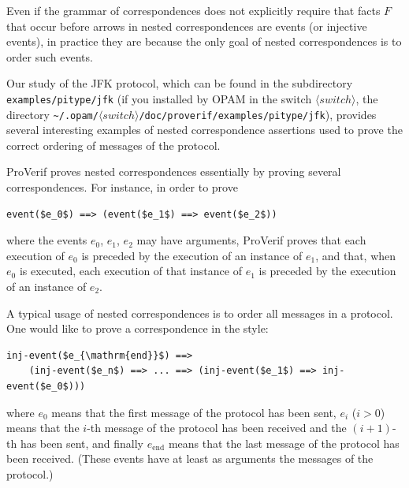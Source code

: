 \documentclass{book}
\newcommand{\nonterm}[1]{\langle\mathit{#1}\rangle}
\newcommand{\switchdir}{\nonterm{switch}}
\newcommand{\opamsubdir}[1]{\nolinkurl{~/.opam/}$\switchdir$\nolinkurl{/#1}}
\begin{document}
Even if the grammar of correspondences does not explicitly require
that facts $F$ that occur before arrows in nested correspondences are
events (or injective events), in practice they are because the only
goal of nested correspondences is to order such events.

Our study of the JFK protocol, which can be found in the subdirectory \nolinkurl{examples/pitype/jfk} (if you installed by OPAM
in the switch $\switchdir$, the directory \opamsubdir{doc/proverif/examples/pitype/jfk}), provides several interesting examples of nested correspondence assertions used to prove the correct ordering of messages of the protocol.

ProVerif proves nested correspondences essentially by proving several correspondences. For instance, in order to prove
\begin{lstlisting}[numbers=none]
	event($e_0$) ==> (event($e_1$) ==> event($e_2$))
\end{lstlisting}
where the events $e_0$, $e_1$, $e_2$ may have arguments, ProVerif
proves that each execution of $e_0$ is preceded by the execution of an
instance of $e_1$, and that, when $e_0$ is executed,
each execution of that instance of $e_1$
is preceded by the execution of an instance of $e_2$.

A typical usage of nested correspondences is to order all messages in a protocol. One would like to prove a correspondence in the style:
\label{page:allmessages}%
\begin{lstlisting}[numbers=none]
  inj-event($e_{\mathrm{end}}$) ==>
    (inj-event($e_n$) ==> ... ==> (inj-event($e_1$) ==> inj-event($e_0$)))
\end{lstlisting}
where $e_0$ means that the first message of the protocol has been sent, $e_i$ ($i>0$) means that the $i$-th message of the protocol has been received and the $(i+1)$-th has been sent, and finally $e_{\mathrm{end}}$ means that the last message of the protocol has been received. (These events have at least as arguments the messages of the protocol.)
\end{document}
